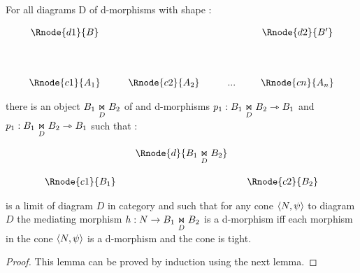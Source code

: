 \documentclass[10pt,a4paper]{scrartcl}
\begin{document}
\begin{lemma}
For all diagrams D of d-morphisms with shape \ndidly:
	
\begin{center}
\begin{displaymath}
\begin{array}{cp{0.3cm}c         p{0.3cm}  c p{0.2cm} c}
\Rnode{d1}{B}& &               & &     & &\Rnode{d2}{B'}  \\ [1.4cm]
\Rnode{c1}{A_1}& &\Rnode{c2}{A_2}& & ... & &\Rnode{cn}{A_n}
\end{array}
\end{displaymath}
\end{center}

there is an object  $ \fibrex{B_1}{B_2}{D}$ of  and d-morphisms 
$p_1: \fibrex{B_1}{B_2}{D} \dmorph B_1$ and  $p_1: \fibrex{B_1}{B_2}{D} \dmorph B_1$ such that :

\begin{center}
\begin{displaymath}
\begin{array}{cp{0cm}cp{0cm} c}
            & &\Rnode{d}{\fibrex{B_1}{B_2}{D}}                  \\ [0.6cm]
\Rnode{c1}{B_1}& &                & & \Rnode{c2}{B_2} 
\end{array}
\end{displaymath}
\end{center}

is a limit of diagram $D$ in category  and such that for any cone $\tuple{N,\psi}$ to diagram $D$
the mediating morphism $h: N \morph B_1 \underset{D}{\Join} B_2$ is a d-morphism iff 
each morphism in the cone $\tuple{N,\psi}$ is a d-morphism and the 
cone is tight. 

\end{lemma}
\begin{proof}
\noindent This lemma can be proved by induction using the next lemma.
\end{proof}
\end{document}
